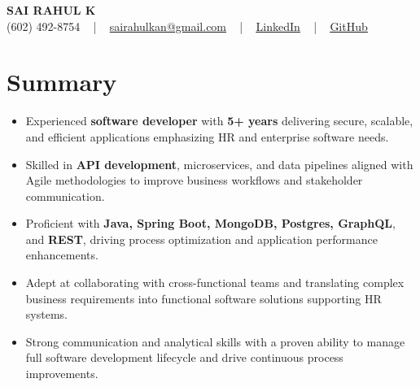 \documentclass[letterpaper,11pt]{article}
\newcommand{\resumeItem}[1]{
  \item\footnotesize{
    {#1 \vspace{-2pt}}
  }
}
\newcommand{\resumeItemListStart}{\begin{itemize}[leftmargin=*]}
\newcommand{\resumeItemListEnd}{\end{itemize}\vspace{-5pt}}
\begin{document}
\begin{center}
    {\fontsize{14pt}{12pt}\selectfont \textbf{\MakeUppercase{Sai Rahul K}}}\\ \vspace{2pt}
    \fontsize{10pt}{12pt}\selectfont (602) 492-8754 ~ | ~ \href{mailto:sairahulkan@gmail.com}{sairahulkan@gmail.com} ~ | ~
    \href{https://www.linkedin.com/in/rq123/}{\color{blue}\underline{LinkedIn}} ~ | ~
    \href{https://github.com/kanrahuldo}{\color{blue}\underline{GitHub}}~
    \vspace{-8pt}
\end{center}

\section{Summary}
\fontsize{9pt}{10pt}\selectfont
\resumeItemListStart
    \resumeItem{Experienced \textbf{software developer} with \textbf{5+ years} delivering secure, scalable, and efficient applications emphasizing HR and enterprise software needs.}
    \resumeItem{Skilled in \textbf{API development}, microservices, and data pipelines aligned with Agile methodologies to improve business workflows and stakeholder communication.}
    \resumeItem{Proficient with \textbf{Java, Spring Boot, MongoDB, Postgres, GraphQL}, and \textbf{REST}, driving process optimization and application performance enhancements.}
    \resumeItem{Adept at collaborating with cross-functional teams and translating complex business requirements into functional software solutions supporting HR systems.}
    \resumeItem{Strong communication and analytical skills with a proven ability to manage full software development lifecycle and drive continuous process improvements.}
\resumeItemListEnd
\vspace{-6pt}
\end{document}
